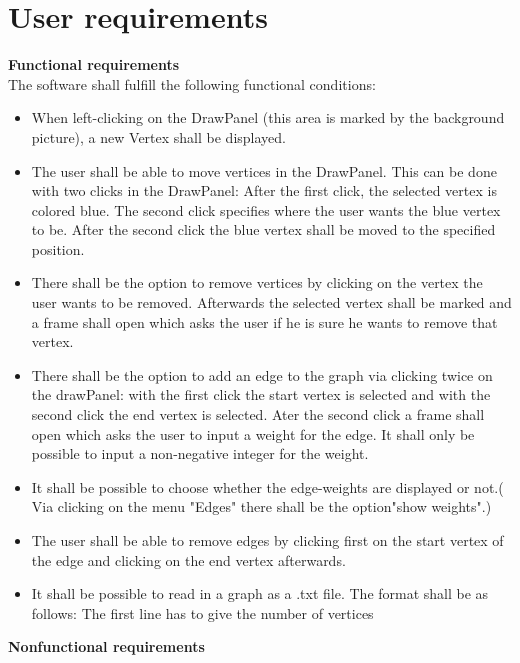 \documentclass{article}
\begin{document}
\section{User requirements}
\textbf{Functional requirements} \\
The software shall fulfill the following functional conditions:
\begin{itemize}
\item When left-clicking on the DrawPanel (this area is marked by the background picture), a new Vertex shall be displayed.
\item The user shall be able to move vertices in the DrawPanel. This can be done with two clicks in the DrawPanel: After the first click, the selected vertex is colored blue. The second click specifies where the user wants the blue vertex to be. After the second click the blue vertex shall be moved to the specified position.
\item There shall be the option to remove vertices by clicking on the vertex the user wants to be removed. Afterwards the selected vertex shall be marked and a frame shall open which asks the user if he is sure he wants to remove that vertex.
\item There shall be the option to add an edge to the graph via clicking twice on the drawPanel: with the first click the start vertex is selected and with the second click the end vertex is selected. Ater the second click a frame shall open which asks the user to input a weight for the edge. It shall only be possible to input a non-negative integer for the weight.
\item It shall be possible to choose whether the edge-weights are displayed or not.( Via clicking on the menu "Edges" there shall be the option"show weights".)
\item The user shall be able to remove edges by clicking first on the start vertex of the edge and clicking on the end vertex afterwards. 

\item It shall be possible to read in a graph as a .txt file. The format shall be as follows:
The first line has to give the number of vertices \\

\end{itemize}  

\textbf{Nonfunctional requirements} \\
\end{document}
